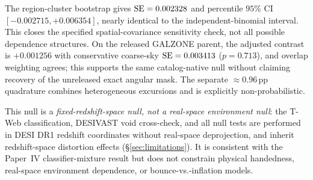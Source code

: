 \documentclass[aps,prd,twocolumn,superscriptaddress,showpacs,preprintnumbers,nofootinbib,longbibliography,floatfix]{revtex4-2}
\begin{document}
The region-cluster bootstrap gives ${\rm SE}=0.002328$ and percentile
$95\%$ CI $[-0.002715,+0.006354]$, nearly identical to the
independent-binomial interval. This closes the specified
spatial-covariance sensitivity check, not all possible dependence
structures. On the released GALZONE parent, the adjusted contrast is
$+0.001256$ with conservative coarse-sky ${\rm SE}=0.003413$
($p=0.713$), and overlap weighting agrees; this supports the same
catalog-native null without claiming recovery of the unreleased exact
angular mask. The separate ${\approx}0.96$\,pp quadrature combines
heterogeneous excursions and is explicitly non-probabilistic.

\begin{center}\end{center}
This null is a \emph{fixed-redshift-space null, not a real-space
environment null}: the T-Web classification, DESIVAST void cross-check,
and all null tests are performed in DESI DR1 redshift coordinates without
real-space deprojection, and inherit redshift-space distortion effects
(\S\ref{sec:limitations}). It is consistent with the Paper~IV
classifier-mixture result but does not constrain physical handedness,
real-space environment dependence, or bounce-vs.-inflation models.
\end{document}
